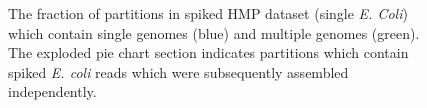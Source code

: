 \documentclass[11pt]{article} %
\begin{document}
\begin{figure}[ht]
\caption{The fraction of partitions in spiked HMP dataset (single
  \emph{E. Coli}) which contain single genomes (blue) and multiple
  genomes (green).  The exploded pie chart section indicates
  partitions which contain spiked \emph{E. coli} reads which were
  subsequently assembled independently.}
\label{ecolimap}
\end{figure}
\end{document}
